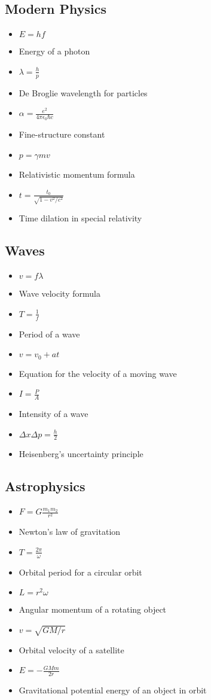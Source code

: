 \documentclass[10pt]{article}
\begin{document}
\begin{multicols*}{3}
        \subsection*{Modern Physics}
\begin{itemize}\footnotesize
        \item $E = hf$
\item[] Energy of a photon
\item $\lambda = \frac{h}{p}$
\item[] De Broglie wavelength for particles
\item $\alpha = \frac{e^2}{4\pi\epsilon_0\hbar c}$
\item[] Fine-structure constant
\item $p = \gamma mv$
\item[] Relativistic momentum formula
\item $t = \frac{t_0}{\sqrt{1 - v^2/c^2}}$
\item[] Time dilation in special relativity
\end{itemize}
        \subsection*{Waves}
\begin{itemize}\footnotesize
        \item $v = f \lambda$
\item[] Wave velocity formula
\item $T = \frac{1}{f}$
\item[] Period of a wave
\item $v = v_0 + at$
\item[] Equation for the velocity of a moving wave
\item $I = \frac{P}{A}$
\item[] Intensity of a wave
\item $\Delta x \Delta p = \frac{h}{2}$
\item[] Heisenberg's uncertainty principle
\end{itemize}
        \subsection*{Astrophysics}
\begin{itemize}\footnotesize
        \item $F = G \frac{m_1 m_2}{r^2}$
\item[] Newton's law of gravitation
\item $T = \frac{2 \pi}{\omega}$
\item[] Orbital period for a circular orbit
\item $L = r^2 \omega$
\item[] Angular momentum of a rotating object
\item $v = \sqrt{GM/r}$
\item[] Orbital velocity of a satellite
\item $E = - \frac{GMm}{2r}$
\item[] Gravitational potential energy of an object in orbit
\end{itemize}

\end{multicols*}
\end{document}
